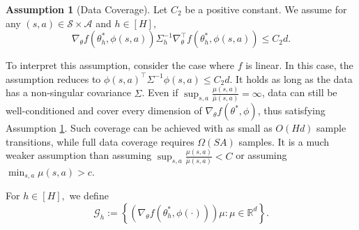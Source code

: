 \documentclass{article}
\numberwithin{equation}{section}
\theoremstyle{plain}
\theoremstyle{definition}
\newtheorem{assumption}[theorem]{Assumption}
\theoremstyle{remark}
\begin{document}
\begin{assumption}[Data Coverage]\label{assumption_data_coverage}
    Let $C_2$ be a positive constant. We assume for any $(s,a) \in \mathcal{S} \times \mathcal{A}$ and $h \in [H],$
    $$
    \nabla_{\theta} f(\theta_h^*,\phi(s,a)) \Sigma_h^{-1} \nabla_{\theta}^{\top} f(\theta_h^*,\phi(s,a)) \leq C_2 d.
    $$
\end{assumption}

To interpret this assumption, consider the case where $f$ is linear. In this case, the assumption reduces to $\phi(s,a)^{\top} \Sigma^{-1}\phi(s,a) \leq C_2 d$. It holds as long as the data has a non-singular covariance $\Sigma$. Even if $\sup_{s,a} \frac{\mu(s,a)}{\bar\mu(s,a)}=\infty$, data can still be well-conditioned and cover every dimension of $\nabla_{\theta} f(\theta^*,\phi)$, thus 
satisfying Assumption \ref{assumption_data_coverage}. Such coverage can be achieved with as small as $O(Hd)$ sample transitions, while full data coverage requires $\Omega(SA)$ samples.  It is a much weaker assumption than assuming $\sup_{s,a} \frac{\mu(s,a)}{\bar\mu(s,a)}<C$ or assuming $\min_{s,a}\mu(s,a) > c $.


For $h \in [H],$ we define
\begin{equation}\label{definition_G_h}
    \mathcal{G}_h := \left\{\left(\nabla_{\theta} f\left(\theta_{h}^*, \phi(\cdot)\right)\right)\mu: \mu \in \mathbb{R}^d\right\}.
\end{equation}
\end{document}
